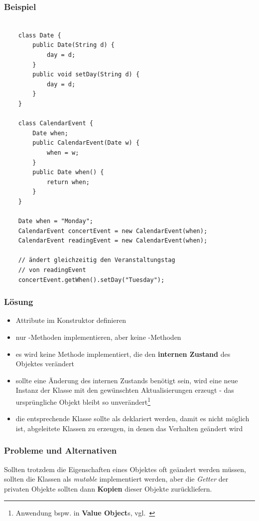 \subsubsection*{Beispiel}

\begin{verbatim}

    class Date {
        public Date(String d) {
            day = d;
        }
        public void setDay(String d) {
            day = d;
        }
    }

    class CalendarEvent {
        Date when;
        public CalendarEvent(Date w) {
            when = w;
        }
        public Date when() {
            return when;
        }
    }

    Date when = "Monday";
    CalendarEvent concertEvent = new CalendarEvent(when);
    CalendarEvent readingEvent = new CalendarEvent(when);

    // ändert gleichzeitig den Veranstaltungstag
    // von readingEvent
    concertEvent.getWhen().setDay("Tuesday");

\end{verbatim}


\subsubsection*{Lösung}

\begin{itemize}
    \item Attribute im Konstruktor definieren
    \item nur -Methoden implementieren, aber keine -Methoden
    \item es wird keine Methode implementiert, die den \textbf{internen Zustand} des Objektes verändert
    \item sollte eine Änderung des internen Zustands benötigt sein, wird eine neue Instanz der Klasse mit den
    gewünschten Aktualisierungen erzeugt - das ursprüngliche Objekt bleibt so unverändert\footnote{
        Anwendung bspw. in \textbf{Value Object}s, vgl.~\cite[486]{Fow03}
    }
    \item die entsprechende Klasse sollte als  deklariert werden, damit es nicht möglich ist, abgeleitete Klassen zu erzeugen, in denen das Verhalten geändert wird
\end{itemize}

\subsubsection*{Probleme und Alternativen}
Sollten trotzdem die Eigenschaften eines Objektes oft geändert werden müssen, sollten die Klassen als \textit{mutable} implementiert werden, aber die \textit{Getter} der privaten Objekte sollten dann \textbf{Kopien} dieser Objekte zurückliefern.

